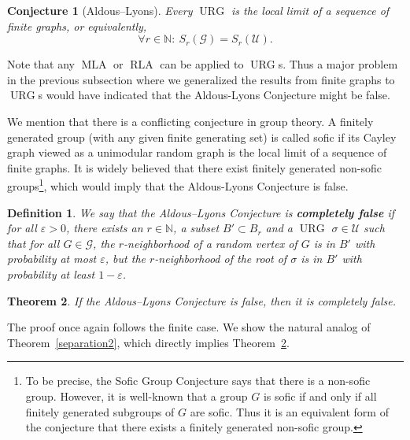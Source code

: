 \documentclass[12pt,a4paper]{article}
\newtheorem{Def}{Definition}
\newtheorem{Theorem}{Theorem}
\newtheorem{Conjecture}[Theorem]{Conjecture}
\newcommand{\eps}{\varepsilon}
\newcommand{\G}{\mathcal{G}}
\newcommand{\N}{\mathbb{N}}
\newcommand{\U}{\mathcal{U}}
\renewcommand{\:}{\colon}
\DeclareMathOperator{\RLA}{RLA}
\DeclareMathOperator{\MLA}{MLA}
\DeclareMathOperator{\URG}{URG}
\begin{document}
\begin{Conjecture}[Aldous--Lyons]
Every $\URG$ is the local limit of a sequence of finite graphs, or equivalently,
\begin{equation*}
\forall r \in \N\:\ S_r(\G) = S_r(\U).
\end{equation*}
\end{Conjecture}

Note that any $\MLA$ or $\RLA$ can be applied to $\URG$s. 
Thus a major problem in the previous subsection where we generalized the results from finite graphs to $\URG$s would have indicated that the Aldous-Lyons Conjecture might be false. 

We mention that there is a conflicting conjecture in group theory. 
A finitely generated group (with any given finite generating set) is called sofic if its Cayley graph viewed as a unimodular random graph is the local limit of a sequence of finite graphs. 
It is widely believed that there exist finitely generated non-sofic groups\footnote{To be precise, the Sofic Group Conjecture says that there is a non-sofic group. However, it is well-known that a group $G$ is sofic if and only if all finitely generated subgroups of $G$ are sofic. Thus it is an equivalent form of the conjecture that there exists a finitely generated non-sofic group.}, which would imply that the Aldous-Lyons Conjecture is false. 


\begin{Def}\label{def:AL}
We say that the Aldous--Lyons Conjecture is \textbf{completely false} if for all $\eps > 0$, there exists an $r \in \N$, a subset $B' \subset B_r$ and a $\URG$ $\sigma \in \U$ such that for all $G \in \G$, the $r$-neighborhood of a random vertex of $G$ is in $B'$ with probability at most $\eps$, but the $r$-neighborhood of the root of $\sigma$ is in $B'$ with probability at least $1 - \eps$.
\end{Def}

\begin{Theorem}\label{thm:strAL}
If the Aldous--Lyons Conjecture is false, then it is completely false.
\end{Theorem}


The proof once again follows the finite case. We show the natural analog of Theorem~\ref{separation2}, which directly implies Theorem~\ref{thm:strAL}. 
\end{document}
